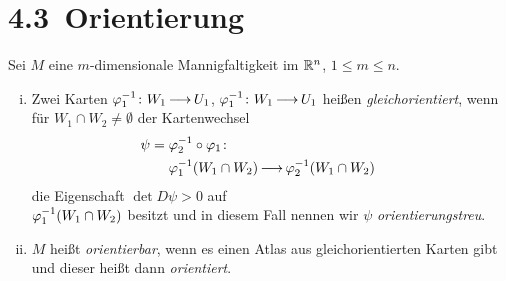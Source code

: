 \documentclass[skript.tex]{subfiles}
\begin{document}
	\begin{center}
	\end{center}
	\newpage
	\section*{4.3\, Orientierung \protect\footnotemark}
	
	\begin{defin}
		Sei $M$ eine $m$-dimensionale Mannigfaltigkeit im ${\mathbb{R}^n}$, $1 \leq m \leq n$.\\
		\begin{minipage}{.5\textwidth}
			\begin{enumerate}[(i)]
				\item Zwei Karten $\varphi_1^{-1} \colon W_1 \kern -1pt \longrightarrow \kern -1pt U_1$, $\varphi_1^{-1} \colon W_1 \kern -1pt \longrightarrow \kern -1pt U_1$ heißen \emph{gleichorientiert}, wenn für $W_1 \cap W_2 \neq \emptyset$ der Kartenwechsel
				\begin{align*}
					\hspace{-2em}
					\psi = \vphi_2^{-1}&\circ\vphi_1 \colon\\ \vphi_1^{-1}&(W_1 \cap W_2) \to \vphi_2^{-1}(W_1 \cap W_2)
				\end{align*}
				die Eigenschaft $\det D\psi > 0$ auf\\$\varphi_1^{-1}(W_1 \cap W_2)$ besitzt und in diesem Fall nennen wir $\psi$ \emph{orientierungstreu}.
				\item $M$ heißt \emph{orientierbar}, wenn es einen Atlas aus gleichorientierten Karten gibt und dieser heißt dann \emph{orientiert}.
			\end{enumerate}
		\end{minipage}
		\hfill
	\end{defin}
\end{document}
